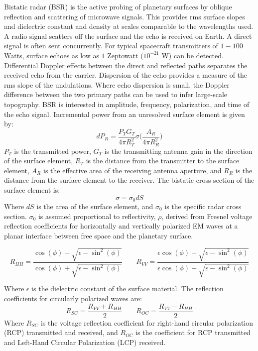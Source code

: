 \documentclass[oneside]{book}
\theoremstyle{mystyle}
\begin{document}
Bistatic radar (BSR) is the active probing of planetary surfaces by oblique reflection and scattering of microwave signals. This provides rms surface slopes and dielectric constant and density at scales comparable to the wavelengths used. A radio signal scatters off the surface and the echo is received on Earth. A direct signal is often sent concurrently. For typical spacecraft transmitters of $1-100$ Watts, surface echoes as low as $1$ Zeptowatt ($10^{-21}$ W) can be detected. Differential Doppler effects between the direct and reflected paths separates the received echo from the carrier. Dispersion of the echo provides a measure of the rms slope of the undulations. Where echo dispersion is small, the Doppler difference between the two primary paths can be used to infer large-scale topography. BSR is interested in amplitude, frequency, polarization, and time of the echo signal. Incremental power from an unresolved surface element is given by:
\begin{equation}
dP_{R} = \frac{P_T G_T}{4\pi R_{T}^2}\sigma\bigg(\frac{A_{R}}{4\pi R_{R}^2}\bigg)
\end{equation}
$P_T$ is the transmitted power, $G_T$ is the transmitting antenna gain in the direction of the surface element, $R_T$ is the distance from the transmitter to the surface element, $A_R$ is the effective area of the receiving antenna aperture, and $R_R$ is the distance from the surface element to the receiver. The bistatic cross section of the surface element is:
\begin{equation}
\sigma = \sigma_{0}dS
\end{equation}
Where $dS$ is the area of the surface element, and $\sigma_0$ is the specific radar cross section. $\sigma_0$ is assumed proportional to reflectivity, $\rho$, derived from Fresnel voltage reflection coefficients for horizontally and vertically polarized EM waves at a planar interface between free space and the planetary surface.

\begin{equation}
R_{HH} = \frac{\cos(\phi) - \sqrt{\epsilon-\sin^2(\phi)}}{\cos(\phi) + \sqrt{\epsilon - \sin^2(\phi)}} \quad \quad
R_{VV} = \frac{\epsilon \cos(\phi) - \sqrt{\epsilon - \sin^{2}(\phi)}}{\epsilon \cos(\phi) + \sqrt{\epsilon - \sin^2(\phi)}}
\end{equation}

\noindent Where $\epsilon$ is the dielectric constant of the surface material. The reflection coefficients for circularly polarized waves are:
\begin{equation}
R_{SC} = \frac{R_{VV}+R_{HH}}{2} \quad \quad
R_{OC} = \frac{R_{VV}-R_{HH}}{2}
\end{equation}
Where $R_{SC}$ is the voltage reflection coefficient for right-hand circular polarization (RCP) transmitted and received, and $R_{OC}$ is the coefficient for RCP transmitted and Left-Hand Circular Polarization (LCP) received.
\end{document}

